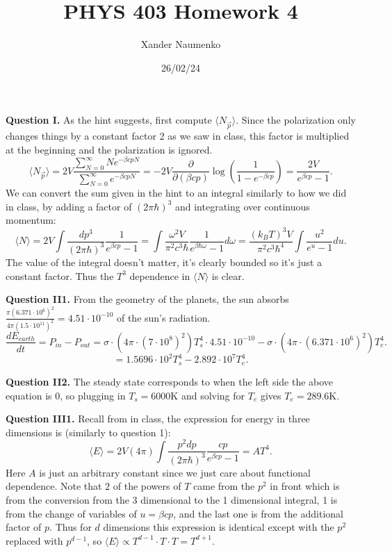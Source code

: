 \documentclass[letterpaper, reqno,11pt]{article}
\begin{document}
\title{PHYS 403 Homework 4}
\date{26/02/24}
\author{Xander Naumenko}
\maketitle

{\medskip\noindent\bf Question I.} As the hint suggests, first compute $\langle N_{\vec p} \rangle $. Since the polarization only changes things by a constant factor 2 as we saw in class, this factor is multiplied at the beginning and the polarization is ignored.
\[
    \langle N_{\vec p} \rangle =2V\frac{\sum_{N=0}^{\infty}Ne^{-\beta cpN}}{\sum_{N=0}^{\infty}e^{-\beta cpN}}=- 2V\frac{\partial}{\partial (\beta cp)}\log \left( \frac{1}{1-e^{-\beta cp}} \right) =\frac{2V}{e^{\beta cp}-1}
.\]
We can convert the sum given in the hint to an integral similarly to how we did in class, by adding a factor of $(2\pi \hbar)^3$ and integrating over continuous momentum:
\[
\langle N \rangle = 2V\int \frac{dp^{3}}{(2\pi \hbar)^3} \frac{1}{e^{\beta cp}-1}= \int \frac{\omega^2V}{\pi^2 c^{3}\hbar}\frac{1}{e^{\beta \hbar\omega}-1}d\omega= \frac{(k_B T)^{3}V}{\pi^2 c^3 \hbar^{4}} \int \frac{u^2}{e^{u}-1}du
.\]
The value of the integral doesn't matter, it's clearly bounded so it's just a constant factor. Thus the $T^{3}$ dependence in $\langle N \rangle $ is clear.

\medskip

{\medskip\noindent\bf Question II1.} From the geometry of the planets, the sun absorbs $\frac{\pi (6.371\cdot 10^{6})^2}{4\pi (1.5\cdot 10^{11})^2}=4.51\cdot 10^{-10}$ of the sun's radiation.
\[
\frac{dE_{earth}}{dt}=P_{in}-P_{out}=\sigma\cdot \left( 4\pi\cdot (7\cdot 10^{8})^2 \right)  T_{s}^{4}\cdot 4.51\cdot 10^{-10}- \sigma\cdot \left( 4\pi\cdot (6.371\cdot 10^{6})^2 \right) T_{e}^{4}
.\]
\[
=1.5696\cdot 10^{2}T_{s}^{4}- 2.892\cdot 10^{7}T_e^{4}
.\]

{\medskip\noindent\bf Question II2.} The steady state corresponds to when the left side the above equation is 0, so plugging in $T_s=6000$K and solving for $T_e$ gives $T_e=289.6$K.

{\medskip\noindent\bf Question III1.} Recall from in class, the expression for energy in three dimensions is (similarly to question 1):
\[
\langle E \rangle = 2V(4\pi)\int \frac{p^2dp}{(2\pi \hbar)^3} \frac{cp}{e^{\beta cp}-1}=AT^{4}
.\]
Here $A$ is just an arbitrary constant since we just care about functional dependence. Note that $2$ of the powers of $T$ came from the $p^2$ in front which is from the conversion from the $3$ dimensional to the 1 dimensional integral, 1 is from the change of variables of $u=\beta cp$, and the last one is from the additional factor of $p$. Thus for $d$ dimensions this expression is identical except with the $p^2$ replaced with $p^{d-1}$, so $\langle E \rangle \propto T^{d-1}\cdot T\cdot T=T^{d+1}$.
\end{document}
